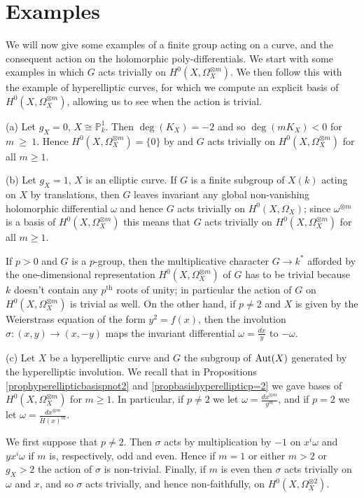 \section{Examples}\label{sectionexamples}
We will now give some examples of a finite group acting on a curve, and the consequent action on the holomorphic poly-differentials. 
We start with some examples in which $G$ acts trivially on $H^0(X,\Omega_X^{\otimes m})$.
We then follow this with the example of hyperelliptic curves, for which we compute an explicit basis of $H^0(X,\Omega_X^{\otimes m})$, allowing us to see when the action is trivial.

(a) Let $g_X = 0$, \ie $X\cong \mathbb P_k^1$.
Then $\deg(K_X) = -2$ and so $\deg(mK_X) < 0$ for $m~\geq~1$.
Hence $H^0(X,\Omega_X^{\otimes m}) =\{0\}$ by \cite[Lem.\ 2, Pg.\ 295]{hart} and $G$ acts trivially on $H^0(X,\Omega_X^{\otimes m})$ for all $m\geq 1$.

(b) Let $g_X = 1$, \ie $X$ is an elliptic curve.
If $G$ is a finite subgroup of $X(k)$ acting on $X$ by translations, then $G$ leaves invariant any global non-vanishing holomorphic differential $\omega$ and hence $G$ acts trivially on $H^0(X,\Omega_X)$;
since $\omega^{\otimes m}$ is a basis of $H^0(X,\Omega_X^{\otimes m})$ this means that $G$ acts trivially on $H^0(X,\Omega_X^{\otimes m})$ for all $m\geq 1$.

If $p>0$ and $G$ is a $p$-group, then the multiplicative character $G\rightarrow k^*$ afforded by the one-dimensional representation $H^0(X,\Omega_X^{\otimes m})$ of $G$ has to be trivial because $k$ doesn't contain any $p^{\mbox{th}}$ roots of unity;
in particular the action of $G$ on $H^0(X,\Omega_X^{\otimes m})$ is trivial as well.
On the other hand, if $p\neq 2$ and $X$ is given by the Weierstrass equation of the form $y^2 = f(x)$, then the involution $\sigma \colon  (x,y) \rightarrow (x,-y)$ maps the invariant differential $\omega = \frac{dx}{y}$ to $-\omega$.

(c) Let $X$ be a hyperelliptic curve and $G$ the subgroup of $\operatorname{Aut}(X)$ generated by the hyperelliptic involution.
We recall that in Propositions \ref{prophyperellipticbasispnot2} and \ref{propbasishyperellipticp=2} we gave bases of $H^0(X,\Omega_X^{\otimes m})$ for $m \geq 1$.
In particular, if $p \neq 2$ we let $\omega = \frac{dx^{\otimes m}}{y^m}$, and if $p=2$ we let $\omega = \frac{dx^{\otimes m}}{H(x)^m}$.

We first suppose that $p \neq 2$.
Then $\sigma$ acts by multiplication by $-1$ on $x^i \omega$ and $y x^i \omega$ if $m$ is, respectively, odd and even.
Hence if $m=1$ or either $m>2$ or $g_X > 2$ the action of $\sigma$ is non-trivial.
Finally, if $m$ is even then $\sigma$ acts trivially on $\omega$ and $x$, and so $\sigma$ acts trivially, and hence non-faithfully, on $H^0(X,\Omega_X^{\otimes 2})$.

